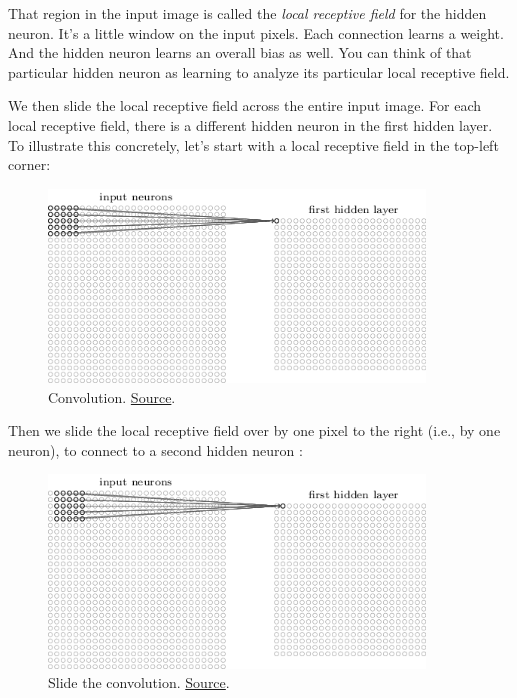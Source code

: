 \documentclass[a4paper]{tufte-handout}
\begin{document}
That region in the input image is called the \emph{local receptive
field} for the hidden neuron. It's a little window on the input pixels.
Each connection learns a weight. And the hidden neuron learns an overall
bias as well. You can think of that particular hidden neuron as learning
to analyze its particular local receptive field.

We then slide the local receptive field across the entire input image.
For each local receptive field, there is a different hidden neuron in
the first hidden layer. To illustrate this concretely, let's start with
a local receptive field in the top-left corner:

\begin{figure}
  \includegraphics[width=100mm]{conv2}
  \caption{Convolution.
\href{http://neuralnetworksanddeeplearning.com/chap6.html\%22}{Source}.
}
\end{figure}


Then we slide the local receptive field over by one pixel
 to the right (i.e., by one
neuron), to connect to a second hidden neuron
:

\begin{figure}
  \includegraphics[width=100mm]{conv3}
  \caption{Slide the convolution.
\href{http://neuralnetworksanddeeplearning.com/chap6.html\%22}{Source}.
}
\end{figure}
\end{document}

